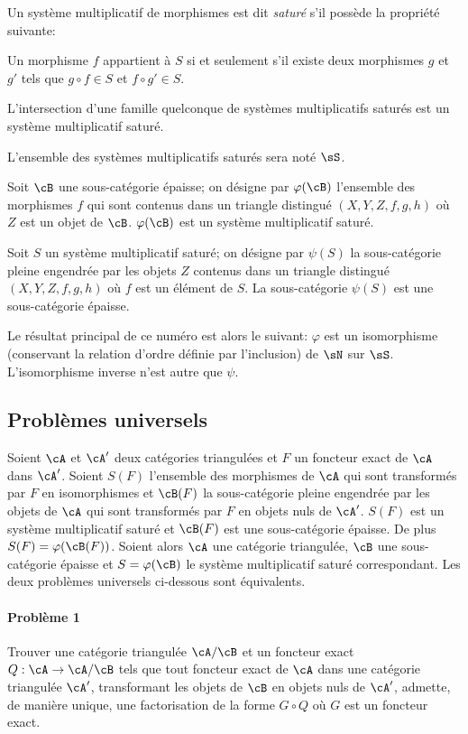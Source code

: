Un système multiplicatif de morphismes est dit \emph{saturé} s'il possède 
la propriété suivante: 

Un morphisme $f$ appartient à $S$ si et seulement s'il existe deux 
morphismes $g$ et $g'$ tels que $g\circ f\in S$ et $f\circ g'\in S$. 

L'intersection d'une famille quelconque de systèmes multiplicatifs saturés 
est un système multiplicatif saturé. 

L'ensemble des systèmes multiplicatifs saturés sera noté $\sS$. 

Soit $\cB$ une sous-catégorie épaisse; on désigne par $\varphi(\cB)$ 
l'ensemble des morphismes $f$ qui sont contenus dans un triangle distingué 
$(X,Y,Z,f,g,h)$ où $Z$ est un objet de $\cB$. $\varphi(\cB)$ est un 
système multiplicatif saturé. 

Soit $S$ un système multiplicatif saturé; on désigne par $\psi(S)$ la 
sous-catégorie pleine engendrée par les objets $Z$ contenus dans un 
triangle distingué $(X,Y,Z,f,g,h)$ où $f$ est un élément de $S$. La 
sous-catégorie $\psi(S)$ est une sous-catégorie épaisse. 

Le résultat principal de ce numéro est alors le suivant: $\varphi$ est un 
isomorphisme (conservant la relation d'ordre définie par l'inclusion) de 
$\sN$ sur $\sS$. L'isomorphisme inverse n'est autre que $\psi$. 










\subsection{Problèmes universels}\label{VIII:2-2}

Soient $\cA$ et $\cA'$ deux catégories triangulées et $F$ un foncteur 
exact de $\cA$ dans $\cA'$. Soient $S(F)$ l'ensemble des morphismes de $\cA$ 
qui sont transformés par $F$ en isomorphismes et $\cB(F)$ la sous-catégorie 
pleine engendrée par les objets de $\cA$ qui sont transformés par $F$ en 
objets nuls de $\cA'$. $S(F)$ est un système multiplicatif saturé et 
$\cB(F)$ est une sous-catégorie épaisse. De plus $S(F) = \varphi(\cB(F))$. 
Soient alors $\cA$ une catégorie triangulée, $\cB$ une sous-catégorie 
épaisse et $S=\varphi(\cB)$ le système multiplicatif saturé 
correspondant. Les deux problèmes universels ci-dessous sont équivalents. 


\paragraph{Problème 1}
\hypertarget{VIII:prob1}{}
Trouver une catégorie triangulée $\cA/\cB$ et un foncteur exact 
$Q:\cA\to \cA/\cB$ tels que tout foncteur exact de $\cA$ dans une catégorie 
triangulée $\cA'$, transformant les objets de $\cB$ en objets nuls de 
$\cA'$, admette, de manière unique, une factorisation de la forme $G\circ Q$ 
où $G$ est un foncteur exact. 


